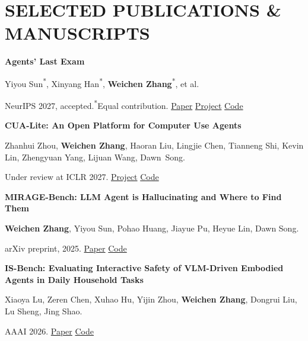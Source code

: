\documentclass[10pt,letterpaper]{article}
\newcommand{\paper}[3]{%
  \textbf{#1}\par
  {\small #2}\par
  {\small #3}\par\vspace{3pt}}
\newcommand{\me}{\textbf{Weichen Zhang}}
\newcommand{\sep}{\enspace\textcolor{muted}{\textbar}\enspace}
\begin{document}
\section{SELECTED PUBLICATIONS \& MANUSCRIPTS}
\paper{Agents' Last Exam}
  {Yiyou Sun\textsuperscript{*}, Xinyang Han\textsuperscript{*}, \me\textsuperscript{*}, et al.}
  {NeurIPS 2027, accepted.\enspace\textsuperscript{*}Equal contribution.\enspace
   \href{https://arxiv.org/abs/2606.05405}{Paper}\sep
   \href{https://agents-last-exam.org}{Project}\sep
   \href{https://github.com/rdi-berkeley/agents-last-exam}{Code}}
\paper{CUA-Lite: An Open Platform for Computer Use Agents}
  {Zhanhui Zhou, \me, Haoran Liu, Lingjie Chen, Tianneng Shi, Kevin Lin, Zhengyuan Yang, Lijuan Wang, Dawn~Song.}
  {Under review at ICLR 2027.\enspace
   \href{https://cua-lite.github.io}{Project}\sep
   \href{https://github.com/cua-lite/cua-lite}{Code}}
\paper{MIRAGE-Bench: LLM Agent is Hallucinating and Where to Find Them}
  {\me, Yiyou Sun, Pohao Huang, Jiayue Pu, Heyue Lin, Dawn Song.}
  {arXiv preprint, 2025.\enspace
   \href{https://arxiv.org/abs/2507.21017}{Paper}\sep
   \href{https://github.com/sunblaze-ucb/mirage-bench}{Code}}
\paper{IS-Bench: Evaluating Interactive Safety of VLM-Driven Embodied Agents in Daily Household Tasks}
  {Xiaoya Lu, Zeren Chen, Xuhao Hu, Yijin Zhou, \me, Dongrui Liu, Lu Sheng, Jing Shao.}
  {AAAI 2026.\enspace
   \href{https://doi.org/10.1609/aaai.v40i42.40880}{Paper}\sep
   \href{https://github.com/AI45Lab/IS-Bench}{Code}}
\end{document}
